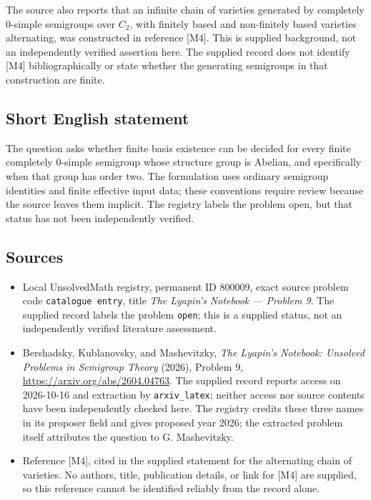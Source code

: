 \documentclass[11pt]{article}
\begin{document}
The source also reports that an infinite chain of varieties generated by completely \(0\)-simple semigroups over \(C_2\), with finitely based and non-finitely based varieties alternating, was constructed in reference [M4]. This is supplied background, not an independently verified assertion here. The supplied record does not identify [M4] bibliographically or state whether the generating semigroups in that construction are finite.
\subsection{Short English statement}
The question asks whether finite basis existence can be decided for every finite completely \(0\)-simple semigroup whose structure group is Abelian, and specifically when that group has order two. The formulation uses ordinary semigroup identities and finite effective input data; these conventions require review because the source leaves them implicit. The registry labels the problem open, but that status has not been independently verified.
\subsection{Sources}
\begin{itemize}
\item Local UnsolvedMath registry, permanent ID \(800009\), exact source problem code \texttt{catalogue entry}, title \emph{The Lyapin's Notebook --- Problem 9}. The supplied record labels the problem \texttt{open}; this is a supplied status, not an independently verified literature assessment.
\item Bershadsky, Kublanovsky, and Mashevitzky, \emph{The Lyapin's Notebook: Unsolved Problems in Semigroup Theory} (2026), Problem 9, \url{https://arxiv.org/abs/2604.04763}. The supplied record reports access on 2026-10-16 and extraction by \texttt{arxiv\_latex}; neither access nor source contents have been independently checked here. The registry credits these three names in its proposer field and gives proposed year 2026; the extracted problem itself attributes the question to G. Mashevitzky.
\item Reference [M4], cited in the supplied statement for the alternating chain of varieties. No authors, title, publication details, or link for [M4] are supplied, so this reference cannot be identified reliably from the record alone.
\end{itemize}
\end{document}
